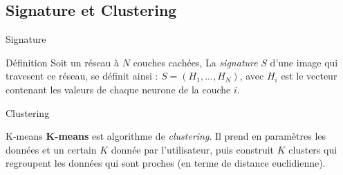 \documentclass[10pt,handout]{beamer}
\newif\ifplacelogo %
\begin{document}
\subsection{Signature et Clustering}
\begin{frame}{Signature}
    \begin{block}{Définition}
        Soit un réseau à $N$ couches cachées, La \textit{signature} $S$ d'une image qui travesent ce réseau, se définit ainsi : $ S = (H_1, ..., H_N) $, avec $H_i$ est le vecteur contenant les valeurs de chaque neurone de la couche $i$.
    \end{block}
\end{frame}
\placelogotrue 

\placelogofalse 
\begin{frame}{Clustering}
    \begin{block}{K-means}
        \textbf{K-means} est algorithme de \textit{clustering}. Il prend en paramètres les
        données et un certain $K$ donnée par l’utilisateur, puis construit $K$ clusters qui regroupent les données qui sont proches (en terme de distance euclidienne).
    \end{block}
\end{frame}
\placelogotrue 
\end{document}
